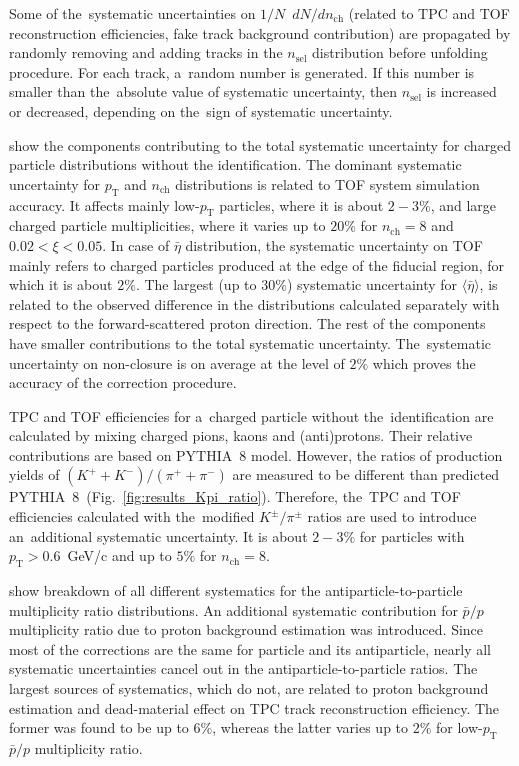 Some of the~systematic uncertainties on $1/N$~$dN/dn_\textrm{ch}$ (related to TPC and TOF reconstruction efficiencies, fake track background contribution)  are propagated by randomly removing and adding tracks in the $n_\textrm{sel}$ distribution before  unfolding procedure. For each track, a~random number is generated. If this number is smaller than the~absolute value of systematic uncertainty, then $n_\textrm{sel}$ is increased or decreased, depending on the~sign of systematic uncertainty.



 show the components contributing to the total systematic uncertainty for charged particle distributions without the identification. The dominant systematic uncertainty for $p_\textrm{T}$ and $n_\textrm{ch}$ distributions is related to TOF system simulation accuracy. It affects mainly low-$p_\textrm{T}$ particles, where it is about $2-3\%$, and large charged particle multiplicities, where it varies up to $20\%$ for $n_\textrm{ch}=8$ and $0.02 < \xi < 0.05$. In case of $\bar{\eta}$ distribution, the systematic uncertainty on TOF mainly refers to charged particles produced at the edge of the fiducial region, for which it is about $2\%$.  The largest (up to $30\%$) systematic uncertainty for $\langle\bar{\eta}\rangle$,  is related to the observed difference  in the distributions calculated separately with respect to the forward-scattered proton direction. The rest of the components have smaller contributions to the total systematic uncertainty. The~systematic uncertainty on non-closure is on average at the level of $2\%$ which proves  the accuracy of the correction procedure. 

TPC and TOF efficiencies for a~charged particle without the~identification are calculated by mixing charged pions, kaons and (anti)protons. Their relative contributions are based on \mbox{PYTHIA~8} model. However, the ratios of production yields of $\left(K^{+}+K^{-}\right)/\left(\pi^{+}+\pi^{-}\right)$ are measured to be different than predicted PYTHIA~8~(Fig.~\ref{fig:results_Kpi_ratio}). Therefore, 
the~TPC and TOF efficiencies calculated with the~modified $K^{\pm}/\pi^{\pm}$ ratios are used to introduce  an~additional systematic uncertainty. It is about $2-3\%$ for particles with $p_\textrm{T}>0.6$~GeV/c and up to $5\%$ for $n_\textrm{ch}=8$.


 show breakdown of all different systematics for the antiparticle-to-particle multiplicity ratio distributions. An additional systematic contribution for $\bar{p}/p$ multiplicity ratio due to proton background estimation was introduced.
Since most of the corrections are the same for particle and its antiparticle, nearly all systematic uncertainties cancel out in the antiparticle-to-particle ratios. 
The largest sources of systematics, which  do not, are related to proton background estimation and dead-material effect on TPC track reconstruction efficiency.  The former was found to be up to $6\%$, whereas the latter varies up to $2\%$ for low-$p_\textrm{T}$ $\bar{p}/p$ multiplicity ratio. 



